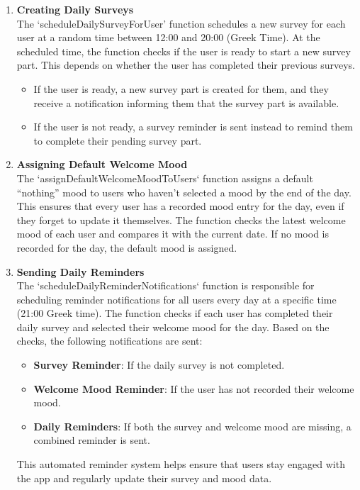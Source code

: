 \begin{enumerate}
    \item \textbf{Creating Daily Surveys} \\
    The `scheduleDailySurveyForUser' function schedules a new survey for each user at a random time between 12:00 and 20:00 (Greek Time). At the scheduled time, the function checks if the user is ready to start a new survey part. This depends on whether the user has completed their previous surveys.
    \begin{itemize}
        \item If the user is ready, a new survey part is created for them, and they receive a notification informing them that the survey part is available.
        \item If the user is not ready, a survey reminder is sent instead to remind them to complete their pending survey part.
    \end{itemize}

    \item \textbf{Assigning Default Welcome Mood} \\
    The `assignDefaultWelcomeMoodToUsers` function assigns a default ``nothing'' mood to users who haven't selected a mood by the end of the day. This ensures that every user has a recorded mood entry for the day, even if they forget to update it themselves. The function checks the latest welcome mood of each user and compares it with the current date. If no mood is recorded for the day, the default mood is assigned.

    \item \textbf{Sending Daily Reminders} \\
    The `scheduleDailyReminderNotifications` function is responsible for scheduling reminder notifications for all users every day at a specific time (21:00 Greek time). The function checks if each user has completed their daily survey and selected their welcome mood for the day. Based on the checks, the following notifications are sent:
    \begin{itemize}
        \item \textbf{Survey Reminder}: If the daily survey is not completed.
        \item \textbf{Welcome Mood Reminder}: If the user has not recorded their welcome mood.
        \item \textbf{Daily Reminders}: If both the survey and welcome mood are missing, a combined reminder is sent.
    \end{itemize}
    This automated reminder system helps ensure that users stay engaged with the app and regularly update their survey and mood data.


\end{enumerate}
